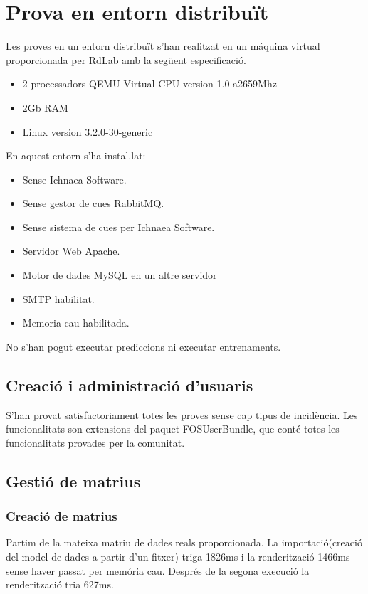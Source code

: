 \section{Prova en entorn distribuït}
Les proves en un entorn distribuït s'han realitzat en un m\'{a}quina virtual proporcionada per RdLab amb la següent especificaci\'{o}.

\begin{itemize}
\item 2 processadors QEMU Virtual CPU version 1.0 a2659Mhz
\item 2Gb RAM	
\item Linux version 3.2.0-30-generic
\end{itemize}
En aquest entorn s'ha instal.lat:
\begin{itemize}
\item Sense Ichnaea Software.
\item Sense gestor de cues RabbitMQ.
\item Sense sistema de cues per Ichnaea Software.
\item Servidor Web Apache.
\item Motor de dades MySQL en un altre servidor
\item SMTP habilitat.
\item Memoria cau habilitada.
\end{itemize}
No s'han pogut executar prediccions ni executar entrenaments.

\subsection{Creaci\'{o} i administraci\'{o} d'usuaris}
S'han provat satisfactoriament totes les proves sense cap tipus de incid\`{e}ncia. Les funcionalitats son extensions del paquet FOSUserBundle, que cont\'{e} totes les funcionalitats provades per la comunitat. 

\subsection{Gesti\'{o} de matrius}
\subsubsection{Creaci\'{o} de matrius}
Partim de la mateixa matriu de dades reals proporcionada. La importaci\'{o}(creaci\'{o} del model de dades a partir d'un fitxer) triga 1826ms i la renderitzaci\'{o} 1466ms sense haver passat per mem\'{o}ria cau. Despr\'{e}s de la segona execuci\'{o} la renderitzaci\'{o} tria 627ms.

